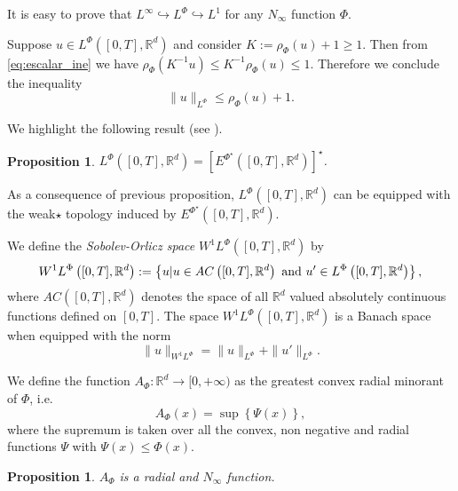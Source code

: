 \documentclass[twoside]{article}
\newtheorem{prop}[thm]{Proposition}
\theoremstyle{remark}
\newcommand{\orlnor}{\|_{L^{\Phi}}}
\newcommand{\lphi}{L^{\Phi}}
\newcommand{\wphi}{W^{1}\lphi}
\newcommand{\rr}{\mathbb{R}}
\renewcommand{\leq}{\leqslant}
\renewcommand{\geq}{\geqslant}
\newcommand{\epsi}{E^{\Phi^{\star}}}
\begin{document}
It is easy to prove that $L^{\infty} \hookrightarrow L^\Phi\hookrightarrow L^1$ for any $N_{\infty}$ function $\Phi$.

Suppose $u\in\lphi([0,T],\rr^d)$ and consider $K:=\rho_{\Phi}(u)+1\geq 1$. Then from \eqref{eq:escalar_ine} we have $\rho_{\Phi}(K^{-1}u)\leq K^{-1}\rho_{\Phi}(u)\leq 1$. Therefore we conclude the inequality
\begin{equation}\label{eq:amemiya}
 \|u\orlnor \leq \rho_{\Phi}(u)+1.
\end{equation}



We highlight the following result (see \cite[Th. 3.3]{gwiazda2013anisotropic}).

\begin{prop} $\lphi\left([0,T],\rr^d\right)=\left[\epsi\left([0,T],\rr^d\right)\right]^{\star}$.
 
\end{prop}


As a consequence of previous proposition,  $\lphi\left([0,T],\rr^d\right)$ can be equipped with the weak$\star$ topology induced by $\epsi\left([0,T],\rr^d\right)$.



We define the \emph{Sobolev-Orlicz space} $\wphi\left([0,T],\rr^d\right)$ by
\[\wphi\left([0,T],\rr^d\right):=\left\{u| u\in AC\left([0,T],\rr^d\right) \hbox{ and } u'\in \lphi\left([0,T],\rr^d\right)\right\},\]
where $AC\left([0,T],\rr^d\right)$ denotes the space of all $\rr^d$ valued absolutely continuous functions defined on $[0,T]$. The space $\wphi\left([0,T],\rr^d\right)$ is a Banach space when equipped with the norm
\begin{equation}\label{def-norma-orlicz-sob}
\|  u  \|_{\wphi}= \|  u  \|_{\lphi} + \|u'\orlnor.
\end{equation}


We define the function $A_{\Phi}:\rr^d\to [0,+\infty)$ as the greatest convex radial minorant of $\Phi$, i.e.
\begin{equation}\label{eq:inversa-gral}
A_{\Phi}(x)=\sup\left\{\Psi(x) \right\},
\end{equation}
where the supremum is taken over all the convex, non negative and radial functions $\Psi$ with $\Psi(x)\leq \Phi(x)$.

\begin{prop}\label{prop:AsubPhi}  $A_{\Phi}$ is a radial and $N_{\infty}$ function.
\end{prop}
\end{document}
